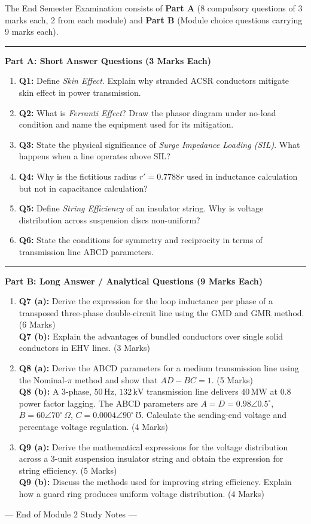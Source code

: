 \documentclass[11pt,a4paper]{article}
\newcommand{\concept}[1]{%
  \vspace{3pt}\noindent\textcolor{AnthGreen}{\rule{3.5pt}{10pt}}\enspace
  \textbf{\sffamily\color{AnthDark}#1}\par\vspace{2pt}%
}
\newenvironment{Warn}[1][Important Exam Alert]{\begin{tcolorbox}[warnbox, title=#1]}{\end{tcolorbox}}
\begin{document}
\begin{Warn}[University Examination Pattern (PCEOT503 Scheme)]
The End Semester Examination consists of \textbf{Part A} (8 compulsory questions of 3 marks each, 2 from each module) and \textbf{Part B} (Module choice questions carrying 9 marks each).
\end{Warn}

\concept{Part A: Short Answer Questions (3 Marks Each)}
\begin{enumerate}
  \item \textbf{Q1:} Define \emph{Skin Effect}. Explain why stranded ACSR conductors mitigate skin effect in power transmission.
  \item \textbf{Q2:} What is \emph{Ferranti Effect}? Draw the phasor diagram under no-load condition and name the equipment used for its mitigation.
  \item \textbf{Q3:} State the physical significance of \emph{Surge Impedance Loading (SIL)}. What happens when a line operates above SIL?
  \item \textbf{Q4:} Why is the fictitious radius $r' = 0.7788r$ used in inductance calculation but not in capacitance calculation?
  \item \textbf{Q5:} Define \emph{String Efficiency} of an insulator string. Why is voltage distribution across suspension discs non-uniform?
  \item \textbf{Q6:} State the conditions for symmetry and reciprocity in terms of transmission line ABCD parameters.
\end{enumerate}

\concept{Part B: Long Answer / Analytical Questions (9 Marks Each)}
\begin{enumerate}
  \item \textbf{Q7 (a):} Derive the expression for the loop inductance per phase of a transposed three-phase double-circuit line using the GMD and GMR method. \hfill (6 Marks) \\
  \textbf{Q7 (b):} Explain the advantages of bundled conductors over single solid conductors in EHV lines. \hfill (3 Marks)
  
  \item \textbf{Q8 (a):} Derive the ABCD parameters for a medium transmission line using the Nominal-$\pi$ method and show that $AD - BC = 1$. \hfill (5 Marks) \\
  \textbf{Q8 (b):} A 3-phase, $50\,\text{Hz}$, $132\,\text{kV}$ transmission line delivers $40\,\text{MW}$ at $0.8$ power factor lagging. The ABCD parameters are $A = D = 0.98 \angle 0.5^\circ$, $B = 60 \angle 70^\circ\,\Omega$, $C = 0.0004 \angle 90^\circ\,\mho$. Calculate the sending-end voltage and percentage voltage regulation. \hfill (4 Marks)

  \item \textbf{Q9 (a):} Derive the mathematical expressions for the voltage distribution across a 3-unit suspension insulator string and obtain the expression for string efficiency. \hfill (5 Marks) \\
  \textbf{Q9 (b):} Discuss the methods used for improving string efficiency. Explain how a guard ring produces uniform voltage distribution. \hfill (4 Marks)
\end{enumerate}

\vfill
\begin{center}
\small\sffamily\color{AnthMidGray}
--- End of Module 2 Study Notes ---
\end{center}
\end{document}

